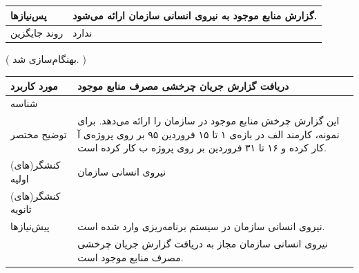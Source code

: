 \begin{table}[H]
\begin{tabular}{|p{3cm}|p{10cm}|}
		پس‌نیازها &
		گزارش منابع موجود به نیروی انسانی سازمان ارائه می‌شود. \\
		\hline
		
		روند جایگزین
		& ندارد \\
		\hline
		
	\end{tabular}
\end{table}


\newpage
\begin{table}[H]
	({\color{red} بهنگام‌سازی شد.  })
	\centering
	\begin{tabular}{|p{3cm}|p{12cm}|}
		\hline	
		
		مورد کاربرد & دریافت گزارش جریان چرخشی مصرف منابع موجود  \\
		\hline
		
		شناسه & 
		\stepcounter{usecase_ID}
		
		\arabic{usecase_ID} \\
		
		\hline
		
		توضیح مختصر & این گزارش چرخش منابع موجود در سازمان را ارائه می‌دهد. برای نمونه، کارمند الف در بازه‌ی ۱ تا ۱۵ فروردین ۹۵ بر روی پروژه‌ی آ کار کرده و ۱۶ تا ۳۱ فروردین بر روی پروژه ب کار کرده است. \\
		\hline
		
		
		کنشگر(های) اولیه& نیروی انسانی سازمان \\
		\hline
		
		کنشگر(های) ثانویه&  \\
		\hline
		
		پیش‌نیازها
		& نیروی انسانی سازمان در سیستم برنامه‌ریزی وارد شده است.\\
		& نیروی انسانی سازمان مجاز به دریافت گزارش جریان چرخشی مصرف منابع موجود است. \\
		\hline
		

\end{tabular}
\end{table}
